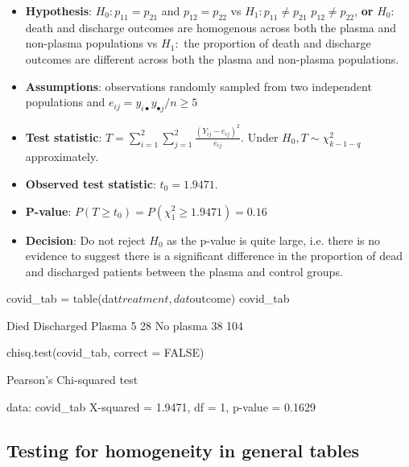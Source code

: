 \documentclass[a4paper]{article}
\begin{document}
\begin{itemize}
	\item \textbf{Hypothesis}: \( H_0: p_{11} = p_{21} \) and \( p_{12} = p_{22} \) vs \( H_1: p_{11} \neq p_{21} \) \( p_{12} \neq p_{22} \), \textbf{or} \( H_0: \)  death and discharge outcomes are homogenous across both the plasma and non-plasma populations vs \( H_1: \) the proportion of death and discharge outcomes are different across both the plasma and non-plasma populations.
	\item \textbf{Assumptions}: observations randomly sampled from two independent populations and \( e_{ij} =y_{i \bullet} y_{\bullet j}/n \geq 5 \)
	\item \textbf{Test statistic}: \( T = \sum\limits_{i=1}^{2}\sum\limits_{j=1}^{2} \frac{(Y_{ij} - e_{ij})^2}{e_{ij}} \). Under \( H_0, T \sim \chi^2_{k-1-q} \) approximately.
	\item \textbf{Observed test statistic}: \( t_0 = 1.9471 \).
	\item \textbf{P-value}: \( P(T\geq t_0) = P(\chi^2_1 \geq 1.9471) = 0.16 \)
	\item \textbf{Decision}: Do not reject \( H_0 \) as the p-value is quite large, i.e. there is no evidence to suggest there is a significant difference in the proportion of dead and discharged patients between the plasma and control groups.
\end{itemize}
\begin{Schunk}
\begin{Sinput}
covid_tab = table(dat$treatment, dat$outcome)
covid_tab
\end{Sinput}
\begin{Soutput}
           
            Died Discharged
  Plasma       5         28
  No plasma   38        104
\end{Soutput}
\begin{Sinput}
chisq.test(covid_tab, correct = FALSE)
\end{Sinput}
\begin{Soutput}

	Pearson's Chi-squared test

data:  covid_tab
X-squared = 1.9471, df = 1, p-value = 0.1629
\end{Soutput}
\end{Schunk}
\subsection{Testing for homogeneity in general tables}
\end{document}
